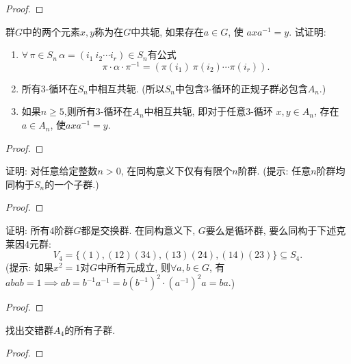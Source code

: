\begin{proof}
    
\end{proof}

\begin{problem}
    群$G$中的两个元素$x, y$称为在$G$中共轭, 如果存在$a \in G$, 使
$axa^{-1} = y$. 试证明: 
\begin{enumerate}[(1)]
    \item $\forall\, \pi \in S_n\, \alpha = (i_1\:i_2 \cdots i_r) \in S_n$有公式
\[
    \pi \cdot \alpha \cdot \pi^{-1} = (\pi(i_1)\:\pi(i_2) \cdots \pi(i_r)).
\]
    \item 所有$3$-循环在$S_n$中相互共轭.
(所以$S_n$中包含$3$-循环的正规子群必包含$A_n$.)
    \item 如果$n \geqslant 5$,则所有$3$-循环在$A_n$中相互共轭, 即对于任意$3$-循环
$x,y \in A_n$, 存在$a \in A_n$, 使$axa^{-1} = y$.
\end{enumerate}
\end{problem}

\begin{proof}
    
\end{proof}

\begin{problem}
    证明: 对任意给定整数$n > 0$, 在同构意义下仅有有限个$n$阶群.
(提示: 任意$n$阶群均同构于$S_n$的一个子群.)
\end{problem}

\begin{proof}
    
\end{proof}

\begin{problem}
    证明: 所有$4$阶群$G$都是交换群. 在同构意义下, $G$要么是循环群, 
要么同构于下述克莱因$4$元群: 
\[
    V_4 = \{(1), (12)(34), (13)(24), (14)(23)\} \subseteq S_4.
\]
(提示: 如果$x^2 = 1$对$G$中所有元成立, 则$\forall a, b \in G$, 有
$abab = 1 \implies ab = b^{-1}a^{-1} = b(b^{-1})^2 \cdot (a^{-1})^2a = ba.$)
\end{problem}

\begin{proof}
    
\end{proof}

\begin{problem}
    找出交错群$A_4$的所有子群.
\end{problem}

\begin{proof}

\end{proof}